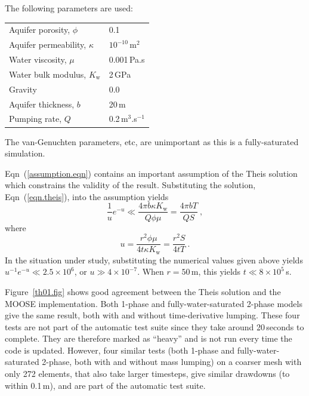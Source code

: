 \documentclass[]{scrreprt}
\begin{document}
The following parameters are used:
\begin{center}
\begin{tabular}{|ll|}
\hline
Aquifer porosity, $\phi$ & 0.1 \\
Aquifer permeability, $\kappa$ & $10^{-10}$\,m$^{2}$ \\
\hline
Water viscosity, $\mu$ & 0.001\,Pa.s \\
Water bulk modulus, $K_{\mathrm{w}}$ & 2\,GPa \\
\hline
Gravity & 0.0 \\
Aquifer thickness, $b$ & 20\,m  \\
Pumping rate, $Q$ & 0.2\,m$^{3}$.s$^{-1}$ \\
\hline
\end{tabular}
\end{center}
The van-Genuchten parameters, etc, are unimportant as this is a
fully-saturated simulation.

Eqn~(\ref{assumption.eqn}) contains an important assumption of the
Theis solution which constrains the validity of the result.
Substituting the solution, Eqn~(\ref{eqn.theis}), into the assumption
yields
\begin{equation} 
\frac{1}{u} e^{-u} \ll \frac{4 \pi b \kappa K_{\mathrm{w}}}{Q\phi\mu}
= \frac{4\pi b T}{QS} \ ,
\end{equation}
where
\begin{equation}
u = \frac{r^{2}\phi\mu}{4t\kappa K_{\mathrm{w}}} = \frac{r^{2}S}{4tT}
\ .
\end{equation}
In the situation under study, substituting the numerical values given
above yields $u^{-1}e^{-u} \ll 2.5\times 10^{6}$, or $u\gg 4\times
10^{-7}$.  When $r=50$\,m, this yields $t\ll 8\times 10^{5}$\,s.

Figure~\ref{th01.fig} shows good agreement between the Theis solution
and the MOOSE implementation.  Both 1-phase and fully-water-saturated
2-phase models give the same result, both with and without
time-derivative lumping.  These four tests are not part of the
automatic test suite since they take around 20\,seconds to complete.
They are therefore marked as ``heavy'' and is not run every time the
code is updated.  However, four similar tests (both 1-phase and
fully-water-saturated 2-phase, both with and without mass lumping) on
a coarser mesh with only 272 elements, that also take larger
timesteps, give similar drawdowns (to within 0.1\,m), and are part of
the automatic test suite.
\end{document}
